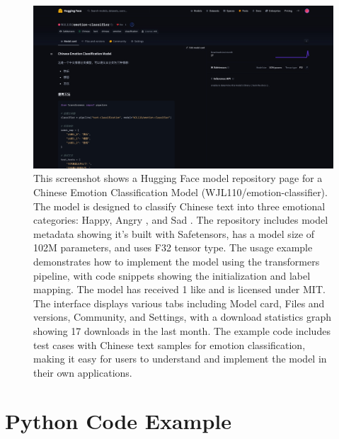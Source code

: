 \documentclass[journal]{IEEEtran}
\begin{document}
\begin{figure}[htb]
    \centering
    \includegraphics[width=\linewidth]{figures/figure_3.jpg}
    \caption{This screenshot shows a Hugging Face model repository page for a Chinese Emotion Classification Model (WJL110/emotion-classifier). The model is designed to classify Chinese text into three emotional categories: Happy, Angry , and Sad . The repository includes model metadata showing it's built with Safetensors, has a model size of 102M parameters, and uses F32 tensor type. The usage example demonstrates how to implement the model using the transformers pipeline, with code snippets showing the initialization and label mapping. The model has received 1 like and is licensed under MIT. The interface displays various tabs including Model card, Files and versions, Community, and Settings, with a download statistics graph showing 17 downloads in the last month. The example code includes test cases with Chinese text samples for emotion classification, making it easy for users to understand and implement the model in their own applications.}
    \label{fig:my_label}
\end{figure}

\section{Python Code Example}
\end{document}
